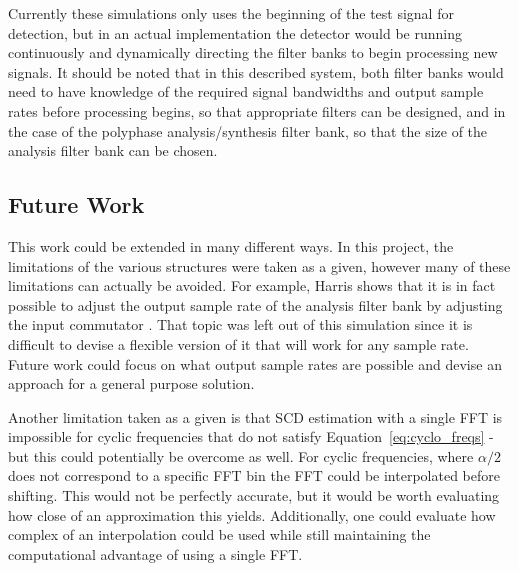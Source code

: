 \documentclass[12pt]{article}
\begin{document}
Currently these simulations only uses the beginning of the test signal for
detection, but in an actual implementation the detector would be running
continuously and dynamically directing the filter banks to begin processing new
signals. It should be noted that in this described system, both filter banks would
need to have knowledge of the required signal bandwidths and output sample
rates before processing begins, so that appropriate filters can be designed, and
in the case of the polyphase analysis/synthesis filter bank, so that the size
of the analysis filter bank can be chosen.

\subsection{Future Work}
This work could be extended in many different ways. In this project, the
limitations of the various structures were taken as a given, however many of
these limitations can actually be avoided. For example, Harris shows that it is
in fact possible to adjust the output sample rate of the analysis filter bank
by adjusting the input commutator \cite{Harris1}. That topic was left out of this
simulation since it is difficult to devise a flexible version of it that will
work for any sample rate. Future work could focus on what output sample rates
are possible and devise an approach for a general purpose solution.

Another limitation taken as a given is that SCD estimation with a single FFT is
impossible for cyclic frequencies that do not satisfy
Equation~\ref{eq:cyclo_freqs} - but this could potentially be overcome as well.
For cyclic frequencies, where $\alpha/2$ does not correspond to a specific FFT
bin the FFT could be interpolated before shifting. This would not be perfectly
accurate, but it would be worth evaluating how close of an approximation this
yields. Additionally, one could evaluate how complex of an interpolation could
be used while still maintaining the computational advantage of using a single FFT.

\end{document}
